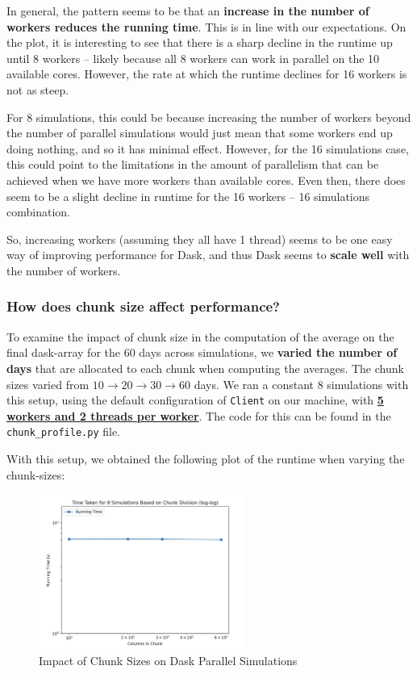 \documentclass[a4paper,12pt]{article}
\begin{document}
In general, the pattern seems to be that an \textbf{increase in the number of workers reduces the running time}. This is in line with our expectations. On the plot, it is interesting to see that there is a sharp decline in the runtime up until 8 workers -- likely because all 8 workers can work in parallel on the 10 available cores. However, the rate at which the runtime declines for 16 workers is not as steep. 

For 8 simulations, this could be because increasing the number of workers beyond the number of parallel simulations would just mean that some workers end up doing nothing, and so it has minimal effect. However, for the 16 simulations case, this could point to the limitations in the amount of parallelism that can be achieved when we have more workers than available cores. Even then, there does seem to be a slight decline in runtime for the 16 workers -- 16 simulations combination. 

So, increasing workers (assuming they all have 1 thread) seems to be one easy way of improving performance for Dask, and thus Dask seems to \textbf{scale well} with the number of workers. 

\subsubsection{How does chunk size affect performance?}
To examine the impact of chunk size in the computation of the average on the final dask-array for the 60 days across simulations, we \textbf{varied the number of days} that are allocated to each chunk when computing the averages. The chunk sizes varied from $10 \rightarrow 20 \rightarrow 30 \rightarrow 60$ days. We ran a constant 8 simulations with this setup, using the default configuration of \verb|Client| on our machine, with \textbf{\underline{5 workers and 2 threads per worker}}. The code for this can be found in the \verb|chunk_profile.py| file. 

With this setup, we obtained the following plot of the runtime when varying the chunk-sizes: 
\begin{figure}[H]
  \centering
  \includegraphics[width=0.6\textwidth]{../images/a4_ex1_chunks.png}
  \caption{Impact of Chunk Sizes on Dask Parallel Simulations}
\end{figure}
\end{document}
